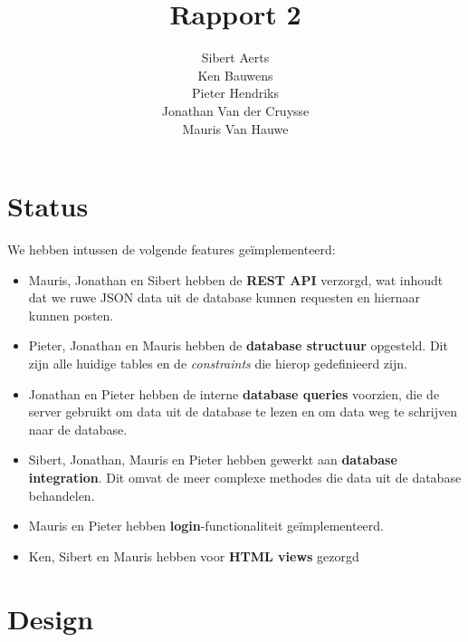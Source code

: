 \documentclass[12pt,draft,parskip=full]{article}
\begin{document}
\title{Rapport 2}
\author{Sibert Aerts \\ Ken Bauwens \\ Pieter Hendriks \\ Jonathan Van der Cruysse \\ Mauris Van Hauwe}
\maketitle

\newcommand{\code}[1]{\texttt{#1}}
% 
\newcommand{\CS}{{C\#}}
\lstset{language=[Sharp]C,basicstyle=\ttfamily}

\section{Status}
We hebben intussen de volgende features ge\"implementeerd:

\begin{itemize}
\item Mauris, Jonathan en Sibert hebben de \textbf{REST API} verzorgd, wat 
inhoudt dat we ruwe JSON data uit de database kunnen requesten en hiernaar 
kunnen posten.

\item Pieter, Jonathan en Mauris hebben de \textbf{database structuur} 
opgesteld. Dit zijn alle huidige tables en de \textit{constraints} die hierop
gedefinieerd zijn.

\item Jonathan en Pieter hebben de interne \textbf{database queries} voorzien, 
die de server gebruikt om data uit de database te lezen en om data weg te 
schrijven naar de database.

\item Sibert, Jonathan, Mauris en Pieter hebben gewerkt aan \textbf{database 
integration}. Dit omvat de meer complexe methodes die data uit de database 
behandelen.

\item Mauris en Pieter hebben \textbf{login}-functionaliteit ge\"implementeerd.

\item Ken, Sibert en Mauris hebben voor \textbf{HTML views} gezorgd

\end{itemize}

\section{Design}
\end{document}

